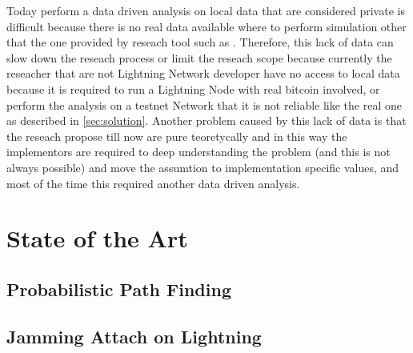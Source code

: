 Today perform a data driven analysis on local data that are considered private
is difficult because there is no real data available where to perform simulation
other that the one provided by reseach tool such as \cite{lngossip}.
Therefore, this lack of data can slow down the reseach process or limit the 
reseach scope because currently the reseacher that are not Lightning Network
developer have no access to local data because it is required to run a 
Lightning Node with real bitcoin involved, or perform the analysis on a 
testnet Network that it is not reliable like the real one as described in 
\ref{sec:solution}. 
Another problem caused by this lack of data is that the reseach propose till now
are pure teoretycally and in this way the implementors are required to deep 
understanding the problem (and this is not always possible) and move the 
assumtion to implementation specific values, and most of the time this required
another data driven analysis.

\section{State of the Art}

\subsection{Probabilistic Path Finding}

\subsection{Jamming Attach on Lightning}
